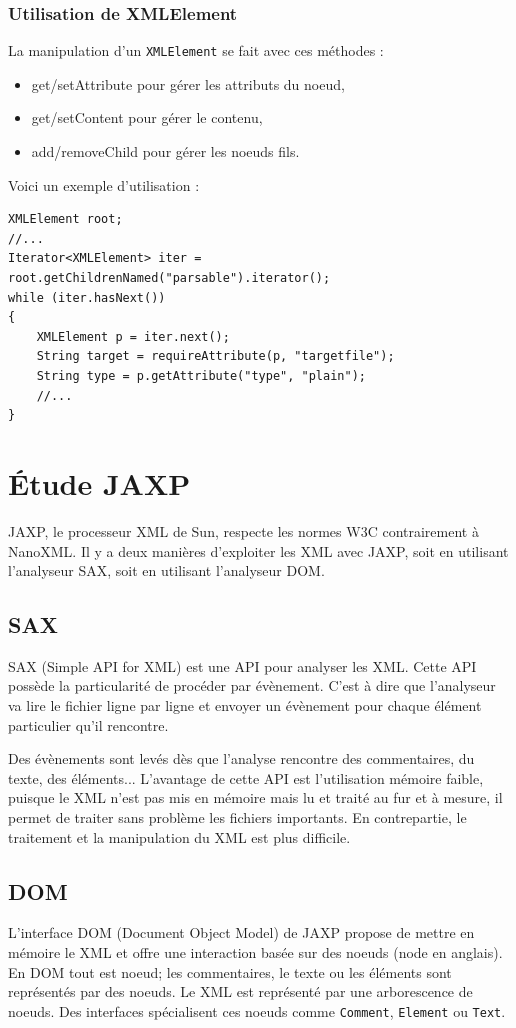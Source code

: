 \subsubsection{Utilisation de XMLElement}
La manipulation d'un \verb|XMLElement| se fait avec ces méthodes :
\begin{itemize}
	\item get/setAttribute pour gérer les attributs du noeud,
	\item get/setContent pour gérer le contenu,
	\item add/removeChild pour gérer les noeuds fils.
\end{itemize}
Voici un exemple d'utilisation :
\begin{lstlisting}
XMLElement root;
//...
Iterator<XMLElement> iter = root.getChildrenNamed("parsable").iterator();
while (iter.hasNext())
{
	XMLElement p = iter.next();
	String target = requireAttribute(p, "targetfile");
	String type = p.getAttribute("type", "plain");
	//...
}
\end{lstlisting}
\section{Étude JAXP}
JAXP, le processeur XML de Sun, respecte les normes W3C contrairement à NanoXML.
Il y a deux manières d'exploiter les XML avec JAXP, soit en utilisant l'analyseur SAX, soit en utilisant l'analyseur DOM.
\subsection{SAX}
SAX (Simple API for XML) est une API pour analyser les XML.
Cette API possède la particularité de procéder par évènement.
C'est à dire que l'analyseur va lire le fichier ligne par ligne et envoyer un évènement pour chaque élément particulier qu'il rencontre.

Des évènements sont levés dès que l'analyse rencontre des commentaires, du texte, des éléments...
L'avantage de cette API est l'utilisation mémoire faible, puisque le XML n'est pas mis en mémoire mais lu et traité au fur et à mesure, il permet de traiter sans problème les fichiers importants.
En contrepartie, le traitement et la manipulation du XML est plus difficile.
\subsection{DOM}
L'interface DOM (Document Object Model) de JAXP propose de mettre en mémoire le XML et offre une interaction basée sur des noeuds (node en anglais).
En DOM tout est noeud; les commentaires, le texte ou les éléments sont représentés par des noeuds.
Le XML est représenté par une arborescence de noeuds.
Des interfaces spécialisent ces noeuds comme \verb|Comment|, \verb|Element| ou \verb|Text|.


